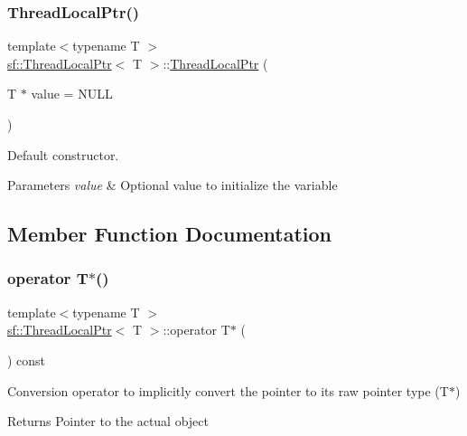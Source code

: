 \subsubsection{\texorpdfstring{Thread\+Local\+Ptr()}{ThreadLocalPtr()}}
{\footnotesize\ttfamily template$<$typename T $>$ \\
\hyperlink{classsf_1_1_thread_local_ptr}{sf\+::\+Thread\+Local\+Ptr}$<$ T $>$\+::\hyperlink{classsf_1_1_thread_local_ptr}{Thread\+Local\+Ptr} (\begin{DoxyParamCaption}\item[{T $\ast$}]{value = {\ttfamily NULL} }\end{DoxyParamCaption})}



Default constructor. 


\begin{DoxyParams}{Parameters}
{\em value} & Optional value to initialize the variable \\
\hline
\end{DoxyParams}


\subsection{Member Function Documentation}
\mbox{\label{classsf_1_1_thread_local_ptr_a81ca089ae5cda72c7470ca93041c3cb2}} 
\subsubsection{\texorpdfstring{operator T$\ast$()}{operator T*()}}
{\footnotesize\ttfamily template$<$typename T $>$ \\
\hyperlink{classsf_1_1_thread_local_ptr}{sf\+::\+Thread\+Local\+Ptr}$<$ T $>$\+::operator T$\ast$ (\begin{DoxyParamCaption}{ }\end{DoxyParamCaption}) const}



Conversion operator to implicitly convert the pointer to its raw pointer type (T$\ast$) 

\begin{DoxyReturn}{Returns}
Pointer to the actual object 
\end{DoxyReturn}
\mbox{\label{classsf_1_1_thread_local_ptr_adcbb45ae077df714bf9c61e936d97770}} 
